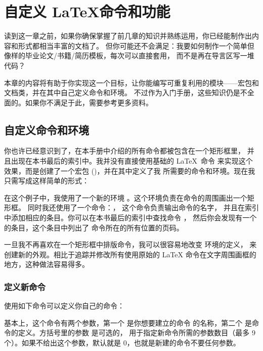 \chapter{自定义 \LaTeX 命令和功能}

\begin{intro}
读到这一章之前，如果你确保掌握了前几章的知识并熟练运用，你已经能制作出内容和形式都相当丰富的文档了。
但你可能还不会满足：我要如何制作一个简单但像样的毕业论文/书籍/简历模板，每次可以直接套用，
而不是再在导言区写一堆代码？

本章的内容将有助于你实现这一个目标，让你能编写可重复利用的模块——宏包和文档类，并在其中自己定义命令和环境。
不过作为入门手册，这些知识仍是不全面的。如果你不满足于此，需要参考更多资料。
\end{intro}

\section{自定义命令和环境}

你也许已经意识到了，在本手册中介绍的所有命令都被包含在一个矩形框里，
并且出现在本书最后的索引中。我并没有直接使用基础的 \LaTeX\ 命令
来实现这个效果，而是创建了一个宏包 ()，并在其中定义了我
所需要的命令和环境。现在我只需写成这样简单的形式：

\begin{example}
\begin{command}
\end{command}
\end{example}

在这个例子中，我使用了一个新的环境 。这个环境负责在命令的周围画出一个矩形框。
同时我还使用了一个命令：， 这个命令负责输出命令的名字，
并且在索引中添加相应的条目。你可以在本书最后的索引中查找命令 ，
然后你会发现有一个  的条目，这个条目中列出了  命令所在的所有位置的页码。

一旦我不再喜欢在一个矩形框中排版命令，我可以很容易地改变  环境的定义，
来创建新的外观。相比于追踪并修改所有使用原始的 \LaTeX{} 命令在文字周围画框的地方，这种做法容易得多。

\subsection{定义新命令}

使用如下命令可以定义你自己的命令：
\begin{command}
\end{command}
基本上，这个命令有两个参数，第一个  是你想要建立的命令
的名称，第二个  是命令的定义。方括号里的参数  是可选的，
用于指定新命令所需的参数数目（最多 9 个）。如果不给出这个参数，默认就是 0，也就是新建的命令不要任何参数。

